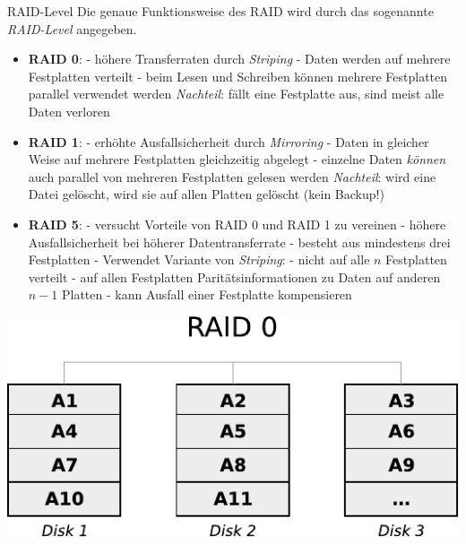 \documentclass[german]{spicker}
\begin{document}
\begin{defi}{RAID-Level}
    Die genaue Funktionsweise des RAID wird durch das sogenannte \emph{RAID-Level} angegeben.

    \begin{itemize}
        \item \textbf{RAID 0}:
              \subitem - höhere Transferraten durch \emph{Striping}
              \subitem - Daten werden auf mehrere Festplatten verteilt
              \subitem - beim Lesen und Schreiben können mehrere Festplatten parallel verwendet werden
              \subitem \emph{Nachteil}: fällt eine Festplatte aus, sind meist alle Daten verloren
        \item \textbf{RAID 1}:
              \subitem - erhöhte Ausfallsicherheit durch \emph{Mirroring}
              \subitem - Daten in gleicher Weise auf mehrere Festplatten gleichzeitig abgelegt
              \subitem - einzelne Daten \emph{können} auch parallel von mehreren Festplatten gelesen werden
              \subitem \emph{Nachteil}: wird eine Datei gelöscht, wird sie auf allen Platten gelöscht (kein Backup!)
        \item \textbf{RAID 5}:
              \subitem - versucht Vorteile von RAID 0 und RAID 1 zu vereinen
              \subitem - höhere Ausfallsicherheit bei höherer Datentransferrate
              \subitem - besteht aus mindestens drei Festplatten
              \subitem - Verwendet Variante von \emph{Striping}:
              \subsubitem - nicht auf alle $n$ Festplatten verteilt
              \subsubitem - auf allen Festplatten Paritätsinformationen zu Daten auf anderen $n-1$ Platten
              \subsubitem - kann Ausfall einer Festplatte kompensieren
    \end{itemize}


    \begin{center}
        \includegraphics[]{images/raid0.pdf}


\end{center}
\end{defi}
\end{document}
